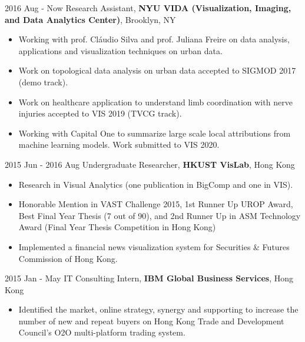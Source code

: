 2016 Aug - Now \hspace{8mm} 
Research Assistant, \textbf{NYU VIDA (Visualization, Imaging, and Data Analytics Center)}, Brooklyn, NY
\vspace{-1mm}
\begin{itemize}[noitemsep,itemsep=0pt,topsep=0pt,leftmargin=38mm]
    \item Working with prof. Cl\'audio Silva and prof. Juliana Freire on data analysis, applications and visualization techniques on urban data.
    \item Work on topological data analysis on urban data accepted to SIGMOD 2017 (demo track).
    \item Work on healthcare application to understand limb coordination with nerve injuries accepted to VIS 2019
    (TVCG track).
    \item Working with Capital One to summarize large scale local attributions from machine learning
    models. Work submitted to VIS 2020.
\end{itemize}

2015 Jun - 2016 Aug \hspace{1.5mm}
Undergraduate Researcher, \textbf{HKUST VisLab}, Hong Kong
\vspace{-1mm}
\begin{itemize}[noitemsep,itemsep=0pt,topsep=0pt,leftmargin=38mm]
    \item Research in Visual Analytics (one publication in BigComp and one in VIS).
    \item Honorable Mention in VAST Challenge 2015, 1st Runner Up UROP Award, Best Final Year Thesis (7 out of 90), and 2nd Runner Up in ASM Technology Award (Final Year Thesis Competition in Hong Kong)
    \item Implemented a financial news visualization system for Securities \& Futures Commission of Hong Kong.
\end{itemize}


\vspace{10mm}

2015 Jan - May \hspace{10mm} 
IT Consulting Intern, \textbf{IBM Global Business Services}, Hong Kong
\vspace{-1mm}
\begin{itemize}[noitemsep,itemsep=0pt,topsep=0pt,leftmargin=38mm]
    \item Identified the market, online strategy, synergy and supporting to increase the number of new and repeat
    buyers on Hong Kong Trade and Development Council's O2O multi-platform trading system.
\end{itemize}

